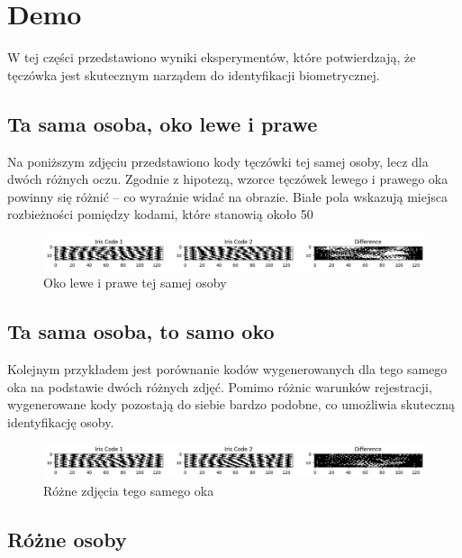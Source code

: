 \documentclass[a4paper]{article}
\begin{document}
\section{Demo}

W tej części przedstawiono wyniki eksperymentów, które potwierdzają, że tęczówka jest skutecznym narządem do identyfikacji biometrycznej.

\subsection*{Ta sama osoba, oko lewe i prawe}

Na poniższym zdjęciu przedstawiono kody tęczówki tej samej osoby, lecz dla dwóch różnych oczu. Zgodnie z hipotezą, wzorce tęczówek lewego i prawego oka powinny się różnić – co wyraźnie widać na obrazie. Białe pola wskazują miejsca rozbieżności pomiędzy kodami, które stanowią około 50

\begin{figure}[H]
    \centering
    \includegraphics[width=0.75\linewidth]{figures/ta_sama_osoba_lewe_i_prawe.png}
    \caption{Oko lewe i prawe tej samej osoby}
\end{figure}

\subsection*{Ta sama osoba, to samo oko}

Kolejnym przykładem jest porównanie kodów wygenerowanych dla tego samego oka na podstawie dwóch różnych zdjęć. Pomimo różnic warunków rejestracji, wygenerowane kody pozostają do siebie bardzo podobne, co umożliwia skuteczną identyfikację osoby.

\begin{figure}[H]
    \centering
    \includegraphics[width=0.75\linewidth]{figures/ta_sama_osoba_to_samo_oko.png}
    \caption{Różne zdjęcia tego samego oka}
\end{figure}

\subsection*{Różne osoby}
\end{document}
